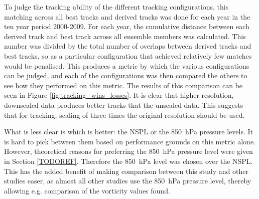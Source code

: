 \documentclass[pdftex,12pt,a4paper]{report}
\begin{document}
To judge the tracking ability of the different tracking configurations, this matching across all
best tracks and derived tracks was done for each year in the ten year period 2000-2009. For each
year, the cumulative distance between each derived track and best track across all ensemble members
was calculated. This number was divided by the total number of overlaps between derived tracks and
best tracks, so as a particular configuration that achieved relatively few matches would be
penalised. This produces a metric by which the various configurations can be judged, and each of
the configurations was then compared the others to see how they performed on this metric. The
results of this comparison can be seen in Figure \ref{fig:tracking_wins_losses}. It is clear that
higher resolution, downscaled data produces better tracks that the unscaled data. This suggests that
for tracking, scaling of three times the original resolution should be used.

What is less clear is which is better: the NSPL or the \SI{850}{hPa} pressure levels. It is hard to
pick between them based on performance grounds on this metric alone. However, theoretical reasons
for preferring the \SI{850}{hPa} pressure level were given in Section \ref{TODOREF}. Therefore the
\SI{850}{hPa} level was chosen over the NSPL. This has the added benefit of making comparison
between this study and other studies easer, as almost all other studies use the \SI{850}{hPa}
pressure level, thereby allowing e.g. comparison of the vorticity values found.
\end{document}
